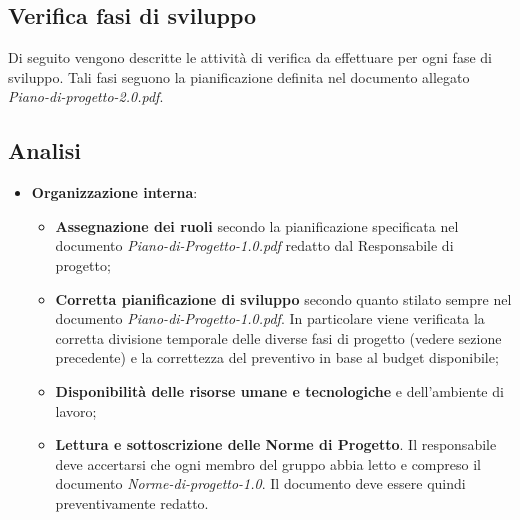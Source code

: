 \documentclass[a4paper,11pt]{article}
\begin{document}
\subsection{Verifica fasi di sviluppo}
Di seguito vengono descritte le attività di verifica da effettuare per ogni fase di sviluppo. Tali fasi seguono la pianificazione definita nel documento allegato \textit{Piano-di-progetto-2.0.pdf}.
\subsection{Analisi}
\begin{itemize}
\item \textbf{Organizzazione interna}:
\begin{itemize}
\item \textbf{Assegnazione dei ruoli} secondo la pianificazione specificata nel documento \textit{Piano-di-Progetto-1.0.pdf} redatto dal Responsabile di progetto;
\item \textbf{Corretta pianificazione di sviluppo} secondo quanto stilato sempre nel documento \textit{Piano-di-Progetto-1.0.pdf}. In particolare viene verificata la corretta divisione temporale delle diverse fasi di progetto (vedere sezione precedente) e la correttezza del preventivo in base al budget disponibile;
\item \textbf{Disponibilità delle risorse umane e tecnologiche} e dell'ambiente di lavoro;
\item \textbf{Lettura e sottoscrizione delle Norme di Progetto}. Il responsabile deve accertarsi che ogni membro del gruppo abbia letto e compreso il documento \textit{Norme-di-progetto-1.0}. Il documento deve essere quindi preventivamente redatto.


\end{itemize} 
 

\end{itemize}
\end{document}
